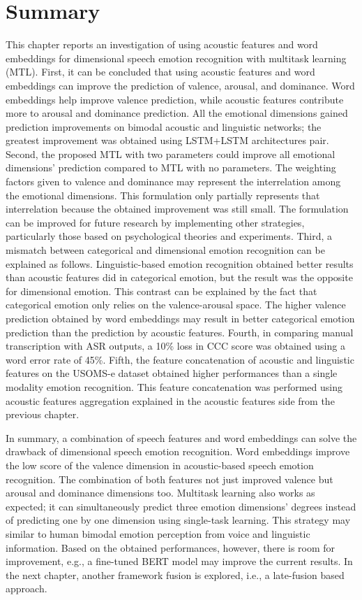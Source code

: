 \section{Summary}
This chapter reports an investigation of using acoustic features and word
embeddings for dimensional speech emotion recognition with multitask learning
(MTL). First, it can be concluded that using acoustic features and word
embeddings can improve the prediction of valence, arousal, and dominance. Word
embeddings help improve valence prediction, while acoustic features contribute
more to arousal and dominance prediction. All the emotional dimensions gained
prediction improvements on bimodal acoustic and linguistic networks; the
greatest improvement was obtained using LSTM+LSTM architectures pair. Second,
the proposed MTL with two parameters could improve all emotional dimensions'
prediction compared to MTL with no parameters. The weighting factors given to
valence and dominance may represent the interrelation among the emotional
dimensions. This formulation only partially represents that interrelation
because the obtained improvement was still small. The formulation can be
improved for future research by implementing other strategies, particularly
those based on psychological theories and experiments.  Third, a mismatch
between categorical and dimensional emotion recognition can be explained as
follows. Linguistic-based emotion recognition obtained better results than
acoustic features did in categorical emotion, but the result was the opposite
for dimensional emotion. This contrast can be explained by the fact that
categorical emotion only relies on the valence-arousal space. The higher
valence prediction obtained by word embeddings may result in better categorical
emotion prediction than the prediction by acoustic features. Fourth, in
comparing manual transcription with ASR outputs, a 10\% loss in CCC score was
obtained using a word error rate of 45\%. Fifth, the feature concatenation of
acoustic and linguistic features on the USOMS-e dataset obtained higher
performances than a single modality emotion recognition. This feature
concatenation was performed using acoustic features aggregation explained in
the acoustic features side from the previous chapter.

In summary, a combination of speech features and word embeddings can solve the
drawback of dimensional speech emotion recognition. Word embeddings improve the
low score of the valence dimension in acoustic-based speech emotion
recognition. The combination of both features not just improved valence but
arousal and dominance dimensions too. Multitask learning also works as
expected; it can simultaneously predict three emotion dimensions' degrees
instead of predicting one by one dimension using single-task learning. This
strategy may similar to human bimodal emotion perception from voice and
linguistic information. Based on the obtained performances, however, there is
room for improvement, e.g., a fine-tuned BERT model may improve the current
results.  In the next chapter, another framework fusion is explored, i.e., a
late-fusion based approach.
